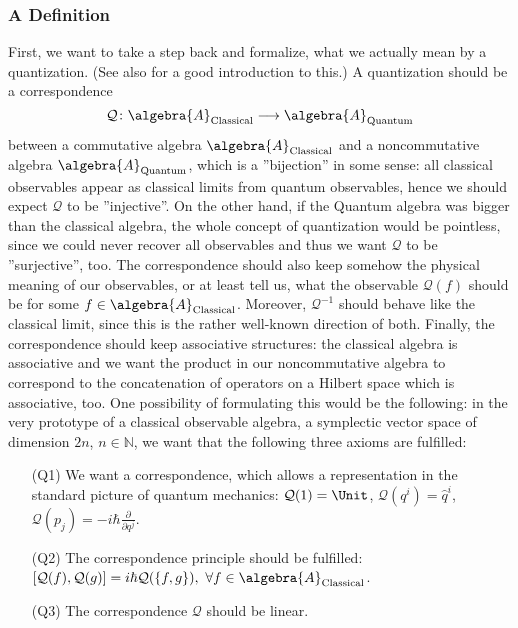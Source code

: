 \subsubsection{A Definition}
First, we want to take a step back and formalize, what we actually mean by a 
quantization. (See also \cite{esposito:2015a} for a good introduction to this.) 
A quantization should be a correspondence
\begin{equation*}
	\mathcal{Q}
	\colon
	\algebra{A}_{\mathrm{Classical}}
	\longrightarrow
	\algebra{A}_{\mathrm{Quantum}}
\end{equation*}
between a commutative algebra $\algebra{A}_{\mathrm{Classical}}$ and a 
noncommutative algebra $\algebra{A}_{\mathrm{Quantum}}$, which is a 
''bijection'' in some sense: all classical observables appear as classical 
limits from quantum observables, hence we should expect $\mathcal{Q}$ to be 
''injective''. On the other hand, if the Quantum algebra was bigger than the 
classical algebra, the whole concept of quantization would be pointless, since 
we could never recover all observables and thus we want $\mathcal{Q}$ to be 
''surjective'', too. The correspondence should also keep somehow the physical 
meaning of our observables, or at least tell us, what the observable 
$\mathcal{Q}(f)$ should be for some $f \in \algebra{A}_{\mathrm{Classical}}$. 
Moreover, $\mathcal{Q}^{-1}$ should behave like the classical limit, since this 
is the rather well-known direction of both. Finally, the correspondence should 
keep associative structures: the classical algebra is associative and we want 
the product in our noncommutative algebra to correspond to the concatenation of 
operators on a Hilbert space which is associative, too. One possibility of 
formulating this would be the following: in the very prototype of a classical 
observable algebra, a symplectic vector space of dimension $2n$, $n \in 
\mathbb{N}$, we want that the following three axioms are fulfilled:
\begin{enumerate}
	\item[(Q1)]
	We want a correspondence, which allows a representation in the standard 
	picture of quantum mechanics:
	$\mathcal{Q}(1) = \Unit$, 
	$\mathcal{Q}(q^i) = \hat{q}^i$, 
	$\mathcal{Q}(p_j) = - i \hbar \frac{\partial}{\partial q^j}$.
	
	\item[(Q2)]
	The correspondence principle should be fulfilled:
	$[\mathcal{Q}(f), \mathcal{Q}(g)] = i \hbar \mathcal{Q}(\{f, g\}), 
	\ \forall f \in \algebra{A}_{\mathrm{Classical}}$.
	
	\item[(Q3)]
	The correspondence $\mathcal{Q}$ should be linear.
\end{enumerate}
